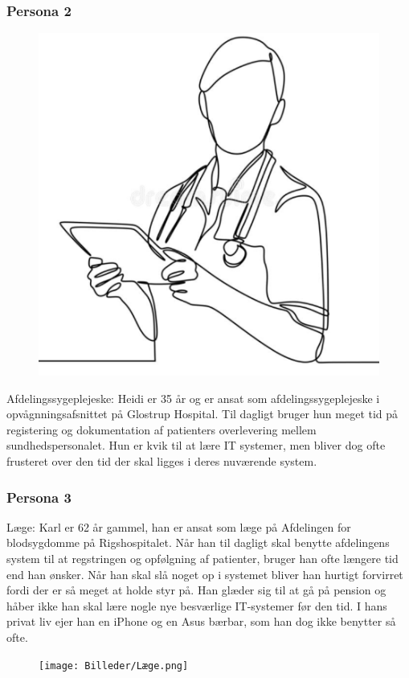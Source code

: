 \subsubsection{Persona 2}
\begin{figure}
\includegraphics[width=0.9\linewidth]{Billeder/Afd- SPL.png} 
\end{figure}
Afdelingssygeplejeske: 
Heidi er 35 år og er ansat som afdelingssygeplejeske i opvågnningsafsnittet på Glostrup Hospital. Til dagligt bruger hun meget tid på registering og dokumentation af patienters overlevering mellem sundhedspersonalet. Hun er kvik til at lære IT systemer, men bliver dog ofte frusteret over den tid der skal ligges i deres nuværende system. 

\subsubsection{Persona 3}

Læge: 
Karl er 62 år gammel, han er ansat som læge på Afdelingen for blodsygdomme på Rigshospitalet. Når han til dagligt skal benytte afdelingens system til at regstringen og opfølgning af patienter, bruger han ofte længere tid end han ønsker. Når han skal slå noget op i systemet bliver han hurtigt forvirret fordi der er så meget at holde styr på. Han glæder sig til at gå på pension og håber ikke han skal lære nogle nye besværlige IT-systemer før den tid.
I hans privat liv ejer han en iPhone og en Asus bærbar, som han dog ikke benytter så ofte. 
\begin{figure}
\texttt{[image: Billeder/Læge.png]} 
\end{figure}

